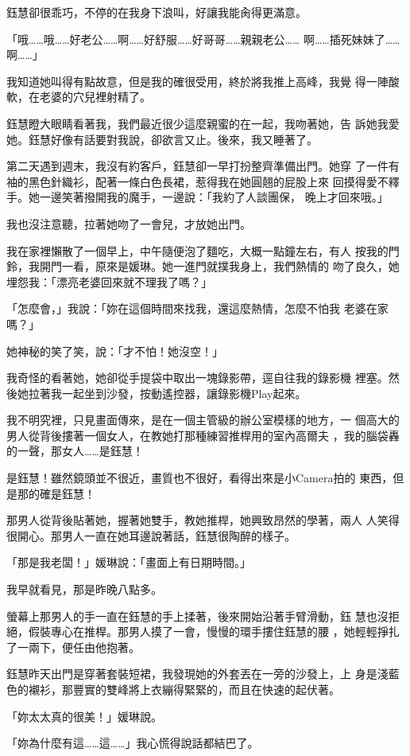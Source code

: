鈺慧卻很乖巧，不停的在我身下浪叫，好讓我能肏得更滿意。

「哦……哦……好老公……啊……好舒服……好哥哥……親親老公……
啊……插死妹妹了……啊……」

我知道她叫得有點故意，但是我的確很受用，終於將我推上高峰，我覺
得一陣酸軟，在老婆的穴兒裡射精了。

鈺慧瞪大眼睛看著我，我們最近很少這麼親蜜的在一起，我吻著她，告
訴她我愛她。鈺慧好像有話要對我說，卻欲言又止。後來，我又睡著了。

第二天遇到週末，我沒有約客戶，鈺慧卻一早打扮整齊準備出門。她穿
了一件有袖的黑色針織衫，配著一條白色長裙，惹得我在她圓翹的屁股上來
回摸得愛不釋手。她一邊笑著撥開我的魔手，一邊說：「我約了人談團保，
晚上才回來哦。」

我也沒注意聽，拉著她吻了一會兒，才放她出門。

我在家裡懶散了一個早上，中午隨便泡了麵吃，大概一點鐘左右，有人
按我的門鈴，我開門一看，原來是媛琳。她一進門就撲我身上，我們熱情的
吻了良久，她埋怨我：「漂亮老婆回來就不理我了嗎？」

「怎麼會，」我說：「妳在這個時間來找我，還這麼熱情，怎麼不怕我
老婆在家嗎？」

她神秘的笑了笑，說：「才不怕！她沒空！」

我奇怪的看著她，她卻從手提袋中取出一塊錄影帶，逕自往我的錄影機
裡塞。然後她拉著我一起坐到沙發，按動遙控器，讓錄影機Play起來。

我不明究裡，只見畫面傳來，是在一個主管級的辦公室模樣的地方，一
個高大的男人從背後摟著一個女人，在教她打那種練習推桿用的室內高爾夫
，我的腦袋轟的一聲，那女人……是鈺慧！

是鈺慧！雖然鏡頭並不很近，畫質也不很好，看得出來是小Camera拍的
東西，但是那的確是鈺慧！

那男人從背後貼著她，握著她雙手，教她推桿，她興致昂然的學著，兩人
人笑得很開心。那男人一直在她耳邊說著話，鈺慧很陶醉的樣子。

「那是我老闆！」媛琳說：「畫面上有日期時間。」

我早就看見，那是昨晚八點多。

螢幕上那男人的手一直在鈺慧的手上揉著，後來開始沿著手臂滑動，鈺
慧也沒拒絕，假裝專心在推桿。那男人摸了一會，慢慢的環手摟住鈺慧的腰
，她輕輕掙扎了一兩下，便任由他抱著。

鈺慧昨天出門是穿著套裝短裙，我發現她的外套丟在一旁的沙發上，上
身是淺藍色的襯衫，那豐實的雙峰將上衣繃得緊緊的，而且在快速的起伏著。

「妳太太真的很美！」媛琳說。

「妳為什麼有這……這……」我心慌得說話都結巴了。

